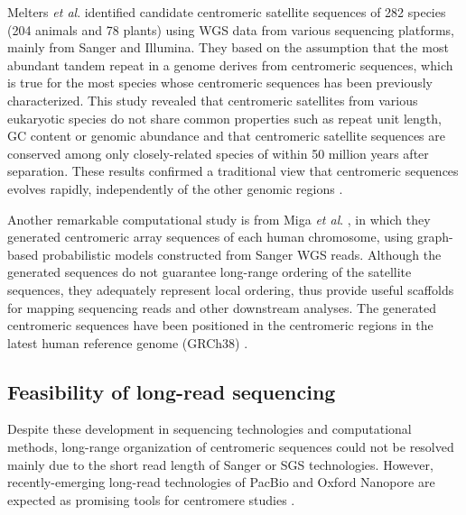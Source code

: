   Melters \textit{et al}. \cite{Melters2013} identified candidate centromeric satellite sequences of 282 species (204 animals and 78 plants) using WGS data from various sequencing platforms, mainly from Sanger and Illumina. They based on the assumption that the most abundant tandem repeat in a genome derives from centromeric sequences, which is true for the most species whose centromeric sequences has been previously characterized. This study revealed that centromeric satellites from various eukaryotic species do not share common properties such as repeat unit length, GC content or genomic abundance and that centromeric satellite sequences are conserved among only closely-related species of within 50 million years after separation. These results confirmed a traditional view that centromeric sequences evolves rapidly, independently of the other genomic regions \cite{Henikoff2001}.

  Another remarkable computational study is from Miga \textit{et al}. \cite{Miga2014}, in which they generated centromeric array sequences of each human chromosome, using graph-based probabilistic models constructed from Sanger WGS reads. Although the generated sequences do not guarantee long-range ordering of the satellite sequences, they adequately represent local ordering, thus provide useful scaffolds for mapping sequencing reads and other downstream analyses. The generated centromeric sequences have been positioned in the centromeric regions in the latest human reference genome (GRCh38) \cite{GenomeRef2013}.


\subsection*{Feasibility of long-read sequencing}
  Despite these development in sequencing technologies and computational methods, long-range organization of centromeric sequences could not be resolved mainly due to the short read length of Sanger or SGS technologies. However, recently-emerging long-read technologies of PacBio \cite{Eid2009} and Oxford Nanopore \cite{Jain2016} are expected as promising tools for centromere studies \cite{Aldrup-MacDonald2014, Miga2015}.

